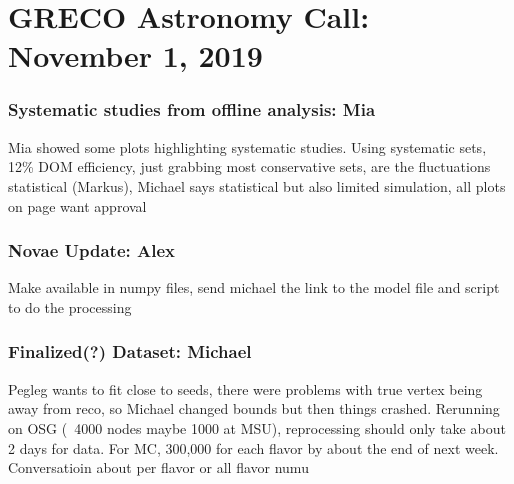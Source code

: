 \chapter{GRECO Astronomy Call: November 1, 2019}

\subsection{Systematic studies from offline analysis: Mia}
Mia showed some plots highlighting systematic studies. Using systematic sets, 12\% DOM efficiency, just grabbing most conservative sets, are the fluctuations statistical (Markus), Michael says statistical but also limited simulation, all plots on page want approval

\subsection{Novae Update: Alex}
Make available in numpy files, send michael the link to the model file and script to do the processing

\subsection{Finalized(?) Dataset: Michael}
Pegleg wants to fit close to seeds, there were problems with true vertex being away from reco, so Michael changed bounds but then things crashed. Rerunning on OSG (~4000 nodes maybe 1000 at MSU), reprocessing should only take about 2 days for data. For MC, 300,000 for each flavor by about the end of next week. Conversatioin about per flavor or all flavor numu